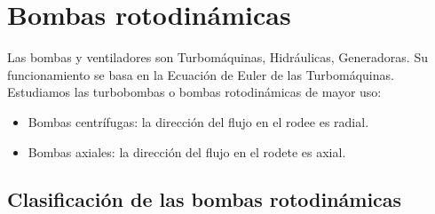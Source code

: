 \section{Bombas rotodinámicas}
Las bombas y ventiladores son Turbomáquinas, Hidráulicas, Generadoras. Su funcionamiento se basa en la Ecuación de Euler de las Turbomáquinas. Estudiamos las turbobombas o bombas rotodinámicas de mayor uso:
\begin{itemize}
    \item Bombas centrífugas: la dirección del flujo en el rodee es radial.
    \item Bombas axiales: la dirección del flujo en el rodete es axial.
\end{itemize}

\subsection{Clasificación de las bombas rotodinámicas}
